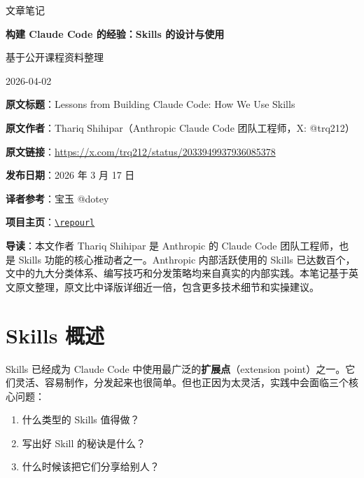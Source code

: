 \documentclass[a4paper]{article}
\newcommand{\notetitle}{构建 Claude Code 的经验：Skills 的设计与使用}
\newcommand{\noteauthors}{基于公开课程资料整理}
\newcommand{\notedate}{2026-04-02}
\begin{document}
\begin{titlepage}
\centering
{\Large 文章笔记\par}
\vspace{1.2cm}
{\huge\bfseries \notetitle\par}
\vspace{0.8cm}
{\large \noteauthors\par}
\vspace{0.3cm}
{\large \notedate\par}
\vspace{1.5cm}

\begin{tcolorbox}[width=0.9\textwidth, colback=black!2!white, colframe=black!60, sharp corners]
\textbf{原文标题}：Lessons from Building Claude Code: How We Use Skills\par
\textbf{原文作者}：Thariq Shihipar（Anthropic Claude Code 团队工程师，X: @trq212）\par
\textbf{原文链接}：\href{https://x.com/trq212/status/2033949937936085378}{https://x.com/trq212/status/2033949937936085378}\par
\textbf{发布日期}：2026 年 3 月 17 日\par
\textbf{译者参考}：宝玉 @dotey\par
\textbf{项目主页}：\href{\repourl}{\nolinkurl{\repourl}}\par
\end{tcolorbox}

\vspace{1cm}

\begin{tcolorbox}[width=0.9\textwidth, colback=blue!3!white, colframe=blue!60, sharp corners]
\textbf{导读}：本文作者 Thariq Shihipar 是 Anthropic 的 Claude Code 团队工程师，也是 Skills 功能的核心推动者之一。Anthropic 内部活跃使用的 Skills 已达数百个，文中的九大分类体系、编写技巧和分发策略均来自真实的内部实践。本笔记基于英文原文整理，原文比中译版详细近一倍，包含更多技术细节和实操建议。
\end{tcolorbox}

\vfill
\end{titlepage}

\tableofcontents
\newpage


\section{Skills 概述}

Skills 已经成为 Claude Code 中使用最广泛的\textbf{扩展点}（extension point）之一。它们灵活、容易制作，分发起来也很简单。但也正因为太灵活，实践中会面临三个核心问题：
\begin{enumerate}
    \item 什么类型的 Skills 值得做？
    \item 写出好 Skill 的秘诀是什么？
    \item 什么时候该把它们分享给别人？
\end{enumerate}
\end{document}
